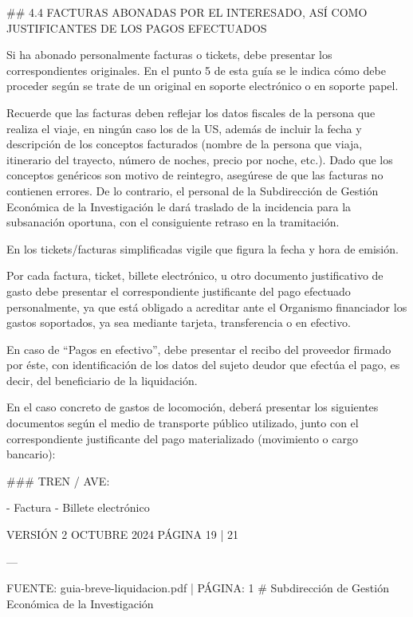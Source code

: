 \documentclass{article}
\begin{document}
\begin{itemize}
\begin{itemize}
\begin{scriptsize}
                  \#\# 4.4 FACTURAS ABONADAS POR EL INTERESADO, ASÍ COMO JUSTIFICANTES DE LOS PAGOS EFECTUADOS

                  Si ha abonado personalmente facturas o tickets, debe presentar los correspondientes originales. En el punto 5 de esta guía se le indica cómo debe proceder según se trate de un original en soporte electrónico o en soporte papel.

                  Recuerde que las facturas deben reflejar los datos fiscales de la persona que realiza el viaje, en ningún caso los de la US, además de incluir la fecha y descripción de los conceptos facturados (nombre de la persona que viaja, itinerario del trayecto, número de noches, precio por noche, etc.). Dado que los conceptos genéricos son motivo de reintegro, asegúrese de que las facturas no contienen errores. De lo contrario, el personal de la Subdirección de Gestión Económica de la Investigación le dará traslado de la incidencia para la subsanación oportuna, con el consiguiente retraso en la tramitación.

                  En los tickets/facturas simplificadas vigile que figura la fecha y hora de emisión.

                  Por cada factura, ticket, billete electrónico, u otro documento justificativo de gasto debe presentar el correspondiente justificante del pago efectuado personalmente, ya que está obligado a acreditar ante el Organismo financiador los gastos soportados, ya sea mediante tarjeta, transferencia o en efectivo.

                  En caso de “Pagos en efectivo”, debe presentar el recibo del proveedor firmado por éste, con identificación de los datos del sujeto deudor que efectúa el pago, es decir, del beneficiario de la liquidación.

                  En el caso concreto de gastos de locomoción, deberá presentar los siguientes documentos según el medio de transporte público utilizado, junto con el correspondiente justificante del pago materializado (movimiento o cargo bancario):

                  \#\#\# TREN / AVE:

                  - Factura
                  - Billete electrónico

                  VERSIÓN 2 OCTUBRE 2024    PÁGINA 19 | 21

                  ---

                  FUENTE: guia-breve-liquidacion.pdf | PÁGINA: 1
                  \# Subdirección de Gestión Económica de la Investigación


\end{scriptsize}
\end{itemize}
\end{itemize}
\end{document}
